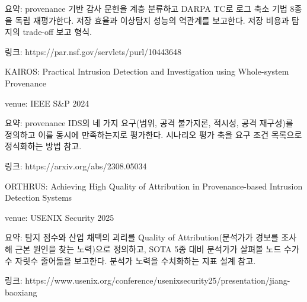 \par\noindent \textbullet\enspace 요약: provenance 기반 감사 문헌을 계층 분류하고 DARPA TC로 로그 축소 기법 8종을 독립 재평가한다. 저장 효율과 이상탐지 성능의 역관계를 보고한다. 저장 비용과 탐지의 trade-off 보고 형식.


\par\noindent \textbullet\enspace 링크: https:/\allowbreak{}/\allowbreak{}par.nsf.gov/\allowbreak{}servlets/\allowbreak{}purl/\allowbreak{}10443648


\par\noindent \textbullet\enspace KAIROS: Practical Intrusion Detection and Investigation using Whole-system Provenance


\par\noindent \textbullet\enspace venue: IEEE S\&P 2024


\par\noindent \textbullet\enspace 요약: provenance IDS의 네 가지 요구(범위, 공격 불가지론, 적시성, 공격 재구성)를 정의하고 이를 동시에 만족하는지로 평가한다. 시나리오 평가 축을 요구 조건 목록으로 정식화하는 방법 참고.


\par\noindent \textbullet\enspace 링크: https:/\allowbreak{}/\allowbreak{}arxiv.org/\allowbreak{}abs/\allowbreak{}2308.05034


\par\noindent \textbullet\enspace ORTHRUS: Achieving High Quality of Attribution in Provenance-based Intrusion Detection Systems


\par\noindent \textbullet\enspace venue: USENIX Security 2025


\par\noindent \textbullet\enspace 요약: 탐지 점수와 산업 채택의 괴리를 Quality of Attribution(분석가가 경보를 조사해 근본 원인을 찾는 노력)으로 정의하고, SOTA 5종 대비 분석가가 살펴볼 노드 수가 수 자릿수 줄어듦을 보고한다. 분석가 노력을 수치화하는 지표 설계 참고.


\par\noindent \textbullet\enspace 링크: https:/\allowbreak{}/\allowbreak{}www.usenix.org/\allowbreak{}conference/\allowbreak{}usenixsecurity25/\allowbreak{}presentation/\allowbreak{}jiang-baoxiang


